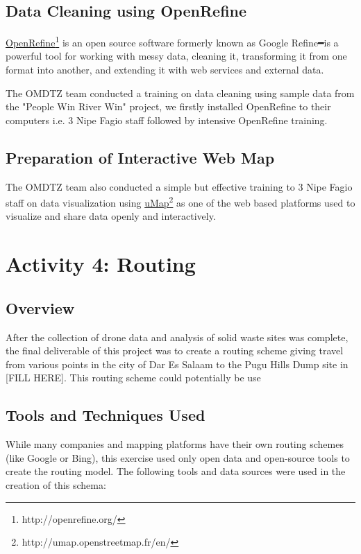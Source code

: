 \documentclass[a4paper,12pt,twoside]{article}
\begin{document}
\subsection{Data Cleaning using OpenRefine}

    \href{http://openrefine.org/}{OpenRefine}\footnote{http://openrefine.org/} is an open source software formerly known as Google Refine━is a powerful tool for working with messy data, cleaning it, transforming it from one format into another, and extending it with web services and external data.

    The OMDTZ team conducted a training on data cleaning using sample data from the "People Win River Win" project,  we firstly installed OpenRefine to their computers i.e. 3 Nipe Fagio staff followed by intensive OpenRefine training. 
\subsection{Preparation of Interactive Web Map}

    The OMDTZ team also conducted a simple but effective training to 3 Nipe Fagio staff on data visualization using \href{http://umap.openstreetmap.fr/en/}{uMap}\footnote{http://umap.openstreetmap.fr/en/}  as one of the  web based platforms used to visualize and share data openly and interactively.

\section{Activity 4: Routing}

\subsection{Overview}
    After the collection of drone data and analysis of solid waste sites was complete, the final deliverable of this project was to create a routing scheme giving travel from various points in the city of Dar Es Salaam to the Pugu Hills Dump site in [FILL HERE].  This routing scheme could potentially be use

\subsection{Tools and Techniques Used}
    While many companies and mapping platforms have their own routing schemes (like Google or Bing), this exercise used only open data and open-source tools to create the routing model. The following tools and data sources were used in the creation of this schema:
    
\end{document}
